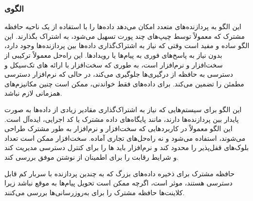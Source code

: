 \subsubsection{الگوی }
\label{distrSharedMemSec}
\begin{RTL}
این الگو \cite{ref4}
به پردازنده‌های متعدد امکان می‌دهد داده‌ها را با استفاده از یک
ناحیه حافظه مشترک که معمولاً توسط چیپ‌های 
چند پورت تسهیل می‌شود، به اشتراک بگذارند. این الگو ساده و مفید است
وقتی که نیاز به اشتراک‌گذاری داده‌ها بین پردازنده‌ها وجود دارد،
بدون نیاز به پاسخ‌های فوری به پیام‌ها یا رویدادها. این راه‌حل معمولاً ترکیبی
از سخت‌افزار و نرم‌افزار است، به طوری که سخت‌افزار با ارائه های
تک‌سیکل  و دسترسی به حافظه از درگیری‌ها جلوگیری می‌کند،
در حالی که نرم‌افزار دسترسی مطمئن را تضمین می‌کند.
برای داده‌های فقط خواندنی، ممکن است چنین مکانیزم‌های همزمانی لازم نباشد.
\end{RTL}
\begin{RTL}
این الگو برای سیستم‌هایی که نیاز به اشتراک‌گذاری مقادیر زیادی از داده‌ها
به صورت پایدار بین پردازنده‌ها دارند، مانند پایگاه‌های داده مشترک یا کد اجرایی،
ایده‌آل است. این الگو معمولاً در کاربردهایی که سخت‌افزار و نرم‌افزار به طور مشترک طراحی
می‌شوند، استفاده می‌شود و نه راه‌حل‌های تجاری آماده.
سخت‌افزار ممکن است تعداد بلوک‌های قفل‌پذیر را محدود کند و نرم‌افزار باید
ها را برای کنترل دسترسی مدیریت کند
و شرایط رقابت را برای اطمینان از نوشتن موفق بررسی کند.
\end{RTL}
\begin{RTL}
حافظه مشترک برای ذخیره داده‌های بزرگ که به چندین پردازنده با سربار
کم قابل دسترسی هستند، موثر است، اگرچه ممکن است تحویل پیام‌ها
به موقع نباشد زیرا کلاینت‌ها حافظه مشترک را برای به‌روزرسانی‌ها بررسی می‌کنند.
\end{RTL}